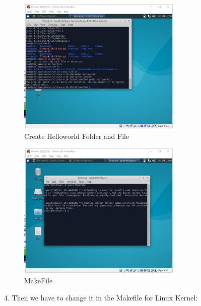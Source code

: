 \documentclass[12pt,a4paper]{article}
\begin{document}
\begin{minipage}{0.5\textwidth}
	\begin{figure}[H]
		\centering
		\includegraphics[width= 0.7\textwidth]{./fig/6_create_helloworld.jpg}
		\caption{Create Helloworld Folder and File}
		\label{fig:create helloworld }
	\end{figure}
\end{minipage}
\begin{minipage}{0.5\textwidth}
	\begin{figure}[H]
		\centering
		\includegraphics[width= 0.7\textwidth]{./fig/7_make_file.jpg}
		\caption{MakeFile}
		\label{fig: make file}
	\end{figure}
\end{minipage}

\par \quad 
\par \quad 

4. Then we have to change it in the Makefile for Linux Kernel:
\end{document}

